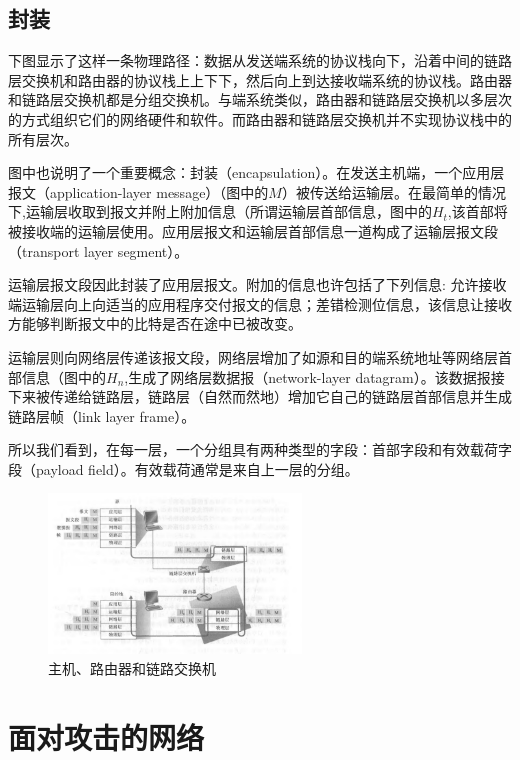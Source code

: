 \subsection{封装}

    下图显示了这样一条物理路径：数据从发送端系统的协议栈向下，沿着中间的链路层交换机和路由器的协议栈上上下下，然后向上到达接收端系统的协议栈。路由器和链路层交换机都是分组交换机。与端系统类似，路由器和链路层交换机以多层次的方式组织它们的网络硬件和软件。而路由器和链路层交换机并不实现协议栈中的所有层次。

    图中也说明了一个重要概念：封装（encapsulation）。在发送主机端，一个应用层报文（application-layer message）（图中的$M$）被传送给运输层。在最简单的情况下,运输层收取到报文并附上附加信息（所谓运输层首部信息，图中的$H_t$,该首部将被接收端的运输层使用。应用层报文和运输层首部信息一道构成了运输层报文段（transport layer segment）。
    
    运输层报文段因此封装了应用层报文。附加的信息也许包括了下列信息: 允许接收端运输层向上向适当的应用程序交付报文的信息；差错检测位信息，该信息让接收方能够判断报文中的比特是否在途中已被改变。
    
    运输层则向网络层传递该报文段，网络层增加了如源和目的端系统地址等网络层首部信息（图中的$H_n$,生成了网络层数据报（network-layer datagram）。该数据报接下来被传递给链路层，链路层（自然而然地）增加它自己的链路层首部信息并生成链路层帧（link layer frame）。
    
    所以我们看到，在每一层，一个分组具有两种类型的字段：首部字段和有效载荷字段（payload field）。有效载荷通常是来自上一层的分组。

\begin{figure}[!htbp]
    \centering
    \includegraphics[width=0.6\textwidth]{image/chapter01/主机、路由器和链路交换层的传输.png}
    \caption{主机、路由器和链路交换机}
\end{figure}

\section{面对攻击的网络}

